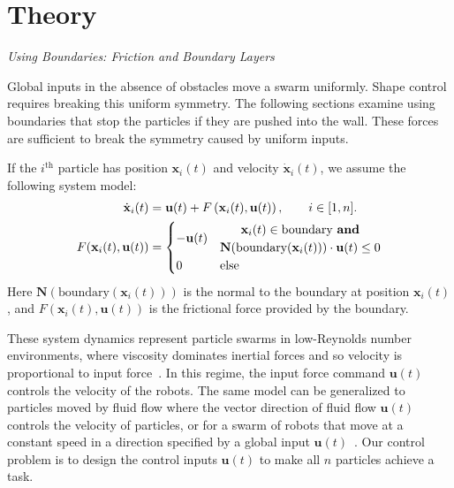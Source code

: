 \section{Theory}
\label{sec:theory}

\emph{Using Boundaries: Friction and Boundary Layers}\label{subsec:WallFriction}

Global inputs in the absence of obstacles move a swarm uniformly.  
Shape control requires breaking this uniform symmetry.
The following sections examine using boundaries that stop the particles if they are pushed into the wall.
 These forces are  sufficient to break the symmetry caused by uniform inputs.  
 
 If the $i^{\textrm{th}}$ particle has position $\mathbf{x}_i(t)$ and velocity $\dot{\mathbf{x}}_i(t)$,  we assume the following system model:
 \begin{align*}\label{eq:swarmDynamicsAndFric} 
\dot{\mathbf{x}}_i(t)
 &=
 \mathbf{u}(t)
 +F \left( \mathbf{x}_i(t), \mathbf{u}(t) \right), \qquad i \in [1,n].\\
 F(\mathbf{x}_i(t), \mathbf{u}(t)) &= \begin{cases}
  - \mathbf{u}(t) &\begin{matrix} \mathbf{x}_i(t) \in  \textrm{boundary \textbf{and}}\\
\mathbf{N}(\textrm{boundary$(\mathbf{x}_i(t))$})\cdot   \mathbf{u}(t) \le 0 \end{matrix}
 \\
 0 & \textrm{else} 
 \end{cases}
 \end{align*}
 Here $\mathbf{N}(\textrm{boundary$(\mathbf{x}_i(t))$})$ is the normal to the boundary at position $\mathbf{x}_i(t)$, and
 $F(\mathbf{x}_i(t), \mathbf{u}(t)) $ is the frictional force provided by the boundary.
 
 
These system dynamics represent particle swarms in low-Reynolds number environments, where viscosity dominates inertial forces and so velocity is proportional to input force~\cite{Purcell1977}. 
 In this regime, the input force command $\mathbf{u}(t)$ controls the velocity of the robots.  
  The same model can be generalized to particles moved by fluid flow where the vector direction of fluid flow $\mathbf{u}(t)$ controls the velocity of particles, or for a swarm of robots that move at a constant speed in a direction specified by a global input $\mathbf{u}(t)$~\cite{Rubenstein2012}.
 Our control problem is to design the control inputs $\mathbf{u}(t)$ to make all $n$ particles achieve a task.